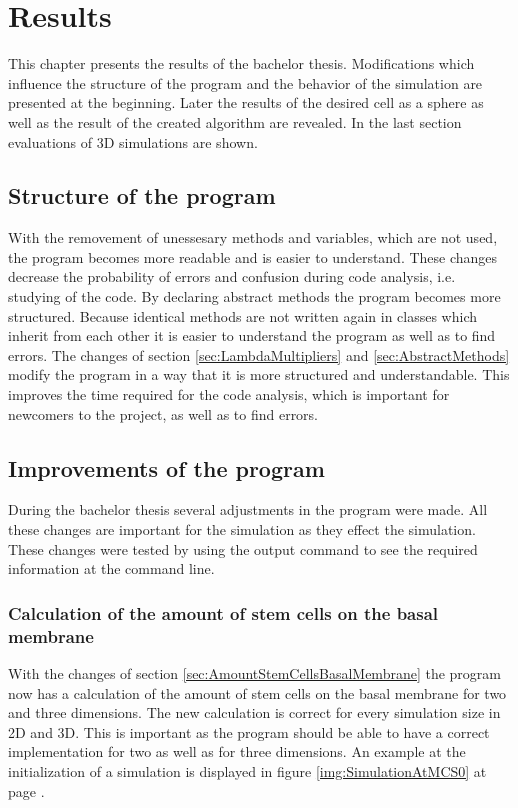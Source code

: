 \chapter{Results}
This chapter presents the results of the bachelor thesis. Modifications which influence the structure of the program and the behavior of the simulation are presented at the beginning. Later the results of the desired cell as a sphere as well as the result of the created algorithm are revealed. In the last section evaluations of 3D simulations are shown.

\section{Structure of the program}
With the removement of unessesary methods and variables, which are not used, the program becomes more readable and is easier to understand. These changes decrease the probability of errors and confusion during code analysis, i.e. studying of the code. By declaring abstract methods the program becomes more structured. Because identical methods are not written again in classes which inherit from each other it is easier to understand the program as well as to find errors. \newline
The changes of section \ref{sec:LambdaMultipliers} and \ref{sec:AbstractMethods} modify the program in a way that it is more structured and understandable. This improves the time required for the code analysis, which is important for newcomers to the project, as well as to find errors. 

\section{Improvements of the program}
During the bachelor thesis several adjustments in the program were made. All these changes are important for the simulation as they effect the simulation. These changes were tested by using the output command to see the required information at the command line. 
\subsection{Calculation of the amount of stem cells on the basal membrane}
With the changes of section \ref{sec:AmountStemCellsBasalMembrane} the program now has a calculation of the amount of stem cells on the basal membrane for two and three dimensions. The new calculation is correct for every simulation size in 2D and 3D. This is important as the program should be able to have a correct implementation for two as well as for three dimensions. An example at the initialization of a simulation is displayed in figure \ref{img:SimulationAtMCS0} at page \pageref{img:SimulationAtMCS0}.
